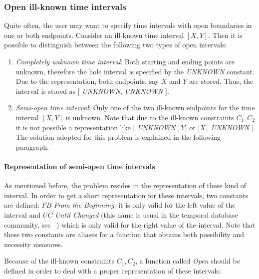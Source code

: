 \subsubsection{\label{subsubsec:open-interval}Open ill-known time intervals}
Quite often, the user may want to specify time intervals with open boundaries in one or both endpoints. Consider an ill-known time interval $\left[X, Y\right]$. Then it is possible to distinguish between the following two types of open intervals:
\begin{enumerate}
\item
\emph{Completely unknown time interval}: Both starting and ending points are unknown, therefore the hole interval is specified by the \emph{UNKNOWN} constant. Due to the representation, both endpoints, say $X$ and $Y$ are stored. Thus, the interval is stored as $[$ \emph{UNKNOWN}, \emph{UNKNOWN} $]$.
\item
\emph{Semi-open time interval}: Only one of the two ill-known endpoints for the time interval $\left[X, Y\right]$ is unknown. Note that due to the ill-known constraints $C_{1}, C_{2}$ it is not possible a representation like $[$ \emph{UNKNOWN} $, Y]$ or $[X, $ \emph{UNKNOWN} $]$. The solution adopted for this problem is explained in the following paragraph.
\end{enumerate}

\paragraph{Representation of semi-open time intervals}
As mentioned before, the problem resides in the representation of these kind of interval. In order to get a short representation for these intervals, two constants are defined: $FB$ \emph{From the Beginning}: it is only valid for the left value of the interval and $UC$ \emph{Until Changed} (this name is usual in the temporal database community, see ~\cite{Jensen1994}) which is only valid for the right value of the interval. Note that these two constants are aliases for a function that obtains both possibility and necessity measures. 

Because of the ill-known constraints $C_{1}, C_{2}$, a function called \emph{Open} should be defined in order to deal with a proper representation of these intervals:

